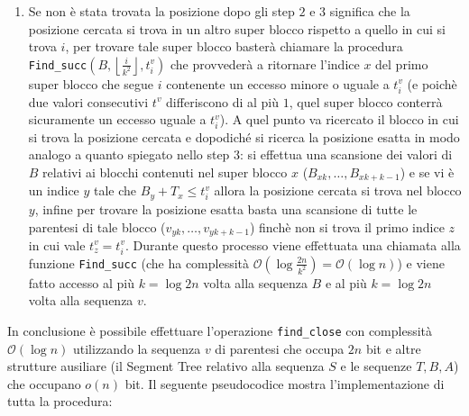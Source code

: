 \documentclass{article}
\begin{document}
\begin{enumerate}
        \item Se non è stata trovata la posizione dopo gli step $2$ e $3$ significa che la posizione cercata si trova in un altro super blocco rispetto a quello in cui si trova $i$, per trovare tale super blocco basterà chiamare la procedura \texttt{Find\_succ}$(B,\left\lfloor{\frac{i}{k^2}}\right\rfloor,t^v_i)$ che provvederà a ritornare l'indice $x$ del primo super blocco che segue $i$ contenente un eccesso minore o uguale a $t^v_i$ (e poichè due valori consecutivi $t^v$ differiscono di al più $1$, quel super blocco conterrà sicuramente un eccesso uguale a $t^v_i$). A quel punto va ricercato il blocco in cui si trova la posizione cercata e dopodiché si ricerca la posizione esatta in modo analogo a quanto spiegato nello step $3$: si effettua una scansione dei valori di $B$ relativi ai blocchi contenuti nel super blocco $x$ ($B_{xk},\dots,B_{xk+k-1}$) e se vi è un indice $y$ tale che $B_y+T_x \leq t^v_i$ allora la posizione cercata si trova nel blocco $y$, infine per trovare la posizione esatta basta una scansione di tutte le parentesi di tale blocco ($v_{yk},\dots,v_{yk+k-1}$) finchè non si trova il primo indice $z$ in cui vale $t^v_z=t^v_i$. Durante questo processo viene effettuata una chiamata alla funzione \texttt{Find\_succ} (che ha complessità $\mathcal{O}(\log{\frac{2n}{k^2}})=\mathcal{O}(\log{n})$) e viene fatto accesso al più $k=\log 2n$ volta alla sequenza $B$ e al più $k=\log 2n$ volta alla sequenza $v$.
    \end{enumerate}
In conclusione è possibile effettuare l'operazione \texttt{find\_close} con complessità $\mathcal{O}(\log{n})$ utilizzando la sequenza $v$ di parentesi che occupa $2n$ bit e altre strutture ausiliare (il Segment Tree relativo alla sequenza $S$ e le sequenze $T,B,A$) che occupano $o(n)$ bit. Il seguente pseudocodice mostra l'implementazione di tutta la procedura:
\end{document}
